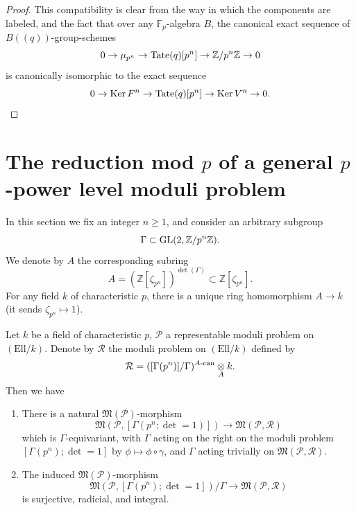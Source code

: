 \begin{proof}
This compatibility is clear from the way in which the components are labeled, and the fact that over any $\mathbb{F}_p$-algebra $B$, the canonical exact sequence of $B((q))$-group-schemes
\[
0 \to \mu_{p^n} \to \mathrm{Tate}(q)[p^n] \to \mathbb{Z}/p^n\mathbb{Z} \to 0
\]
is canonically isomorphic to the exact sequence
\[
0 \to \operatorname{Ker} F^n \to \mathrm{Tate}(q)[p^n] \to \operatorname{Ker} V^n \to 0 .
\]
\end{proof}

\section[The reduction mod {$p$} of a general {$p$}-power level moduli problem]{The reduction mod $p$ of a general $p$-power level moduli problem}
\label{sec:13.10}

\kmitem\label{item:13.10.1}In this section we fix an integer $n \ge 1$, and consider an arbitrary subgroup
\[
\Gamma \subset \operatorname{GL}(2, \mathbb{Z}/p^n\mathbb{Z}) .
\]
We denote by $A$ the corresponding subring
\[
A = (\mathbb{Z}[\zeta_{p^n}])^{\det(\Gamma)} \subset \mathbb{Z}[\zeta_{p^n}] .
\]
For any field $k$ of characteristic $p$, there is a unique ring homomorphism $A \to k$ (it sends $\zeta_{p^n} \mapsto 1$).

\begin{kthm}\label{thm:13.10.2}
Let $k$ be a field of characteristic $p$, $\mathcal{P}$ a representable moduli problem on $(\mathrm{Ell}/k)$. Denote by $\mathcal{R}$ the moduli problem on $(\mathrm{Ell}/k)$ defined by
\[
\mathcal{R} = ([\Gamma(p^n)]/\Gamma)^{A\text{-can}} \underset{A}{\otimes} k .
\]
Then we have
\begin{enumerate}[label=(\arabic*), leftmargin=2.4em]
\item There is a natural $\mathfrak{M}(\mathcal{P})$-morphism
\[
\mathfrak{M}(\mathcal{P}, [\Gamma(p^n; \det = 1)]) \to \mathfrak{M}(\mathcal{P}, \mathcal{R})
\]
which is $\Gamma$-equivariant, with $\Gamma$ acting on the right on the moduli problem $[\Gamma(p^n); \det = 1]$ by $\phi \mapsto \phi \circ \gamma$, and $\Gamma$ acting trivially on $\mathfrak{M}(\mathcal{P}, \mathcal{R})$.
\item The induced $\mathfrak{M}(\mathcal{P})$-morphism
\[
\mathfrak{M}(\mathcal{P}, [\Gamma(p^n); \det = 1])/\Gamma \to \mathfrak{M}(\mathcal{P}, \mathcal{R})
\]
is surjective, radicial, and integral.
\end{enumerate}
\end{kthm}

